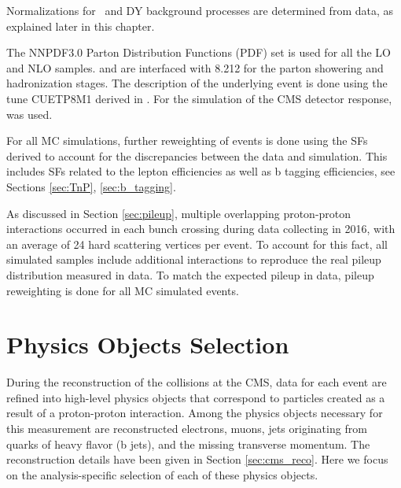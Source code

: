 Normalizations for \ttbar ~and DY background processes are determined from data, as explained later in this chapter.

The NNPDF3.0 \cite{Ball:2014uwa} Parton Distribution Functions
(PDF) set is used for all the LO and NLO samples. {\POWHEG} and {\MGMCatNLO} are interfaced with
{\PYTHIA}8.212 for the parton
showering and hadronization stages. The description of the underlying event is done using the tune CUETP8M1 derived in \cite{Khachatryan:2015pea}. For the simulation of the CMS detector response, \GEANTfour~\cite{GEANT4} was used. 

For all MC simulations, further reweighting of events is done using the SFs derived to account for the discrepancies between the data and simulation. This includes SFs related to the lepton efficiencies as well as b tagging efficiencies, see Sections \ref{sec:TnP}, \ref{sec:b_tagging}.

As discussed in Section \ref{sec:pileup}, multiple overlapping proton-proton interactions occurred in each bunch crossing during data collecting in 2016, with an average of 24 hard scattering vertices per event. To account for this fact, all simulated samples include additional interactions to reproduce the real pileup distribution measured in data. To match the expected pileup in data, pileup reweighting is done for all MC simulated events.

\section{Physics Objects Selection}
\label{sec:objects}


During the reconstruction of the collisions at the CMS, data for each event are refined into high-level physics objects that correspond to particles created as a result of a proton-proton interaction. Among the physics objects necessary for this measurement are reconstructed electrons, muons, jets originating from quarks of heavy flavor (b jets), and the missing transverse momentum. The reconstruction details have been given in Section \ref{sec:cms_reco}. Here we focus on the analysis-specific selection of each of these physics objects.

